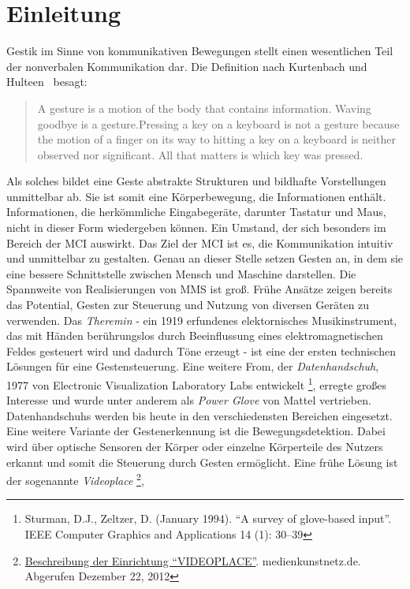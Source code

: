\chapter{Einleitung}
\label{chap:Einleitung}
Gestik im Sinne von kommunikativen Bewegungen stellt einen wesentlichen Teil der nonverbalen Kommunikation dar. Die Definition nach Kurtenbach und Hulteen~\cite{bib:kurtenbach} besagt:
\begin{quote}
A gesture is a motion of the body that contains information. Waving goodbye is a gesture.Pressing a key on a keyboard is not a gesture because the motion of a finger on its way to hitting a key on a keyboard is neither observed nor significant. All that matters is which key was pressed.
\end{quote}
Als solches bildet eine Geste abstrakte Strukturen und bildhafte Vorstellungen unmittelbar ab. Sie ist somit eine K\"orperbewegung, 
die Informationen enth\"alt. Informationen, die herk\"ommliche Eingabeger\"ate, darunter Tastatur und Maus, nicht in dieser Form wiedergeben k\"onnen.
Ein Umstand, der sich besonders im Bereich der \gls{MCI} auswirkt.
\newline
Das Ziel der \gls{MCI} ist es, die Kommunikation intuitiv und unmittelbar zu gestalten.
Genau an dieser Stelle setzen Gesten an, in dem sie eine bessere Schnittstelle zwischen Mensch und Maschine darstellen.
\newline
Die Spannweite von Realisierungen von \gls{MMS} ist gro\ss .
Fr\"uhe Ans\"atze zeigen bereits das Potential, Gesten zur Steuerung und Nutzung von diversen Ger\"aten zu verwenden.
Das \textit{Theremin} - 
ein 1919 erfundenes elektornisches Musikinstrument, das mit H\"anden ber\"uhrungslos durch Beeinflussung eines elektromagnetischen Feldes 
gesteuert wird und dadurch T\"one erzeugt - ist eine der ersten technischen L\"osungen f\"ur eine Gestensteuerung.
Eine weitere From, der \textit{\gls{Datenhandschuh}}, 1977 von Electronic Visualization Laboratory Labs entwickelt
\footnote{Sturman, D.J., Zeltzer, D. (January 1994). \enquote{A survey of glove-based input}. IEEE Computer Graphics and Applications 14 (1): 30–39}, 
erregte gro\ss es Interesse und wurde unter anderem als \textit{Power Glove} von Mattel vertrieben.
\glspl{Datenhandschuh} werden bis heute in den verschiedensten Bereichen eingesetzt.
\newline
Eine weitere Variante der Gestenerkennung ist die \gls{Bewegungsdetektion}. Dabei wird \"uber optische Sensoren der K\"orper oder einzelne K\"orperteile
des Nutzers erkannt und somit die Steuerung durch Gesten erm\"oglicht. Eine fr\"uhe L\"osung ist der sogenannte \textit{Videoplace} \footnote{\href{http://www.medienkunstnetz.de/works/videoplace/}{Beschreibung der Einrichtung \enquote{VIDEOPLACE}}. medienkunstnetz.de. Abgerufen Dezember 22, 2012},
